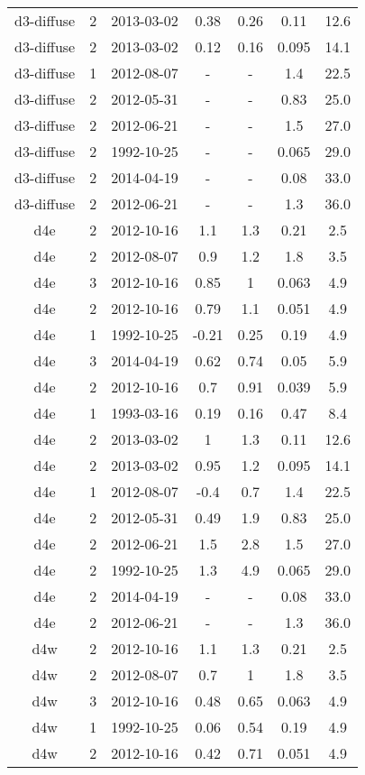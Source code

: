\begin{table*}[htp]
\begin{tabular}{ccccccc}
d3-diffuse & 2 & 2013-03-02 & 0.38 & 0.26 & 0.11 & 12.6 \\
d3-diffuse & 2 & 2013-03-02 & 0.12 & 0.16 & 0.095 & 14.1 \\
d3-diffuse & 1 & 2012-08-07 & - & - & 1.4 & 22.5 \\
d3-diffuse & 2 & 2012-05-31 & - & - & 0.83 & 25.0 \\
d3-diffuse & 2 & 2012-06-21 & - & - & 1.5 & 27.0 \\
d3-diffuse & 2 & 1992-10-25 & - & - & 0.065 & 29.0 \\
d3-diffuse & 2 & 2014-04-19 & - & - & 0.08 & 33.0 \\
d3-diffuse & 2 & 2012-06-21 & - & - & 1.3 & 36.0 \\
d4e & 2 & 2012-10-16 & 1.1 & 1.3 & 0.21 & 2.5 \\
d4e & 2 & 2012-08-07 & 0.9 & 1.2 & 1.8 & 3.5 \\
d4e & 3 & 2012-10-16 & 0.85 & 1 & 0.063 & 4.9 \\
d4e & 2 & 2012-10-16 & 0.79 & 1.1 & 0.051 & 4.9 \\
d4e & 1 & 1992-10-25 & -0.21 & 0.25 & 0.19 & 4.9 \\
d4e & 3 & 2014-04-19 & 0.62 & 0.74 & 0.05 & 5.9 \\
d4e & 2 & 2012-10-16 & 0.7 & 0.91 & 0.039 & 5.9 \\
d4e & 1 & 1993-03-16 & 0.19 & 0.16 & 0.47 & 8.4 \\
d4e & 2 & 2013-03-02 & 1 & 1.3 & 0.11 & 12.6 \\
d4e & 2 & 2013-03-02 & 0.95 & 1.2 & 0.095 & 14.1 \\
d4e & 1 & 2012-08-07 & -0.4 & 0.7 & 1.4 & 22.5 \\
d4e & 2 & 2012-05-31 & 0.49 & 1.9 & 0.83 & 25.0 \\
d4e & 2 & 2012-06-21 & 1.5 & 2.8 & 1.5 & 27.0 \\
d4e & 2 & 1992-10-25 & 1.3 & 4.9 & 0.065 & 29.0 \\
d4e & 2 & 2014-04-19 & - & - & 0.08 & 33.0 \\
d4e & 2 & 2012-06-21 & - & - & 1.3 & 36.0 \\
d4w & 2 & 2012-10-16 & 1.1 & 1.3 & 0.21 & 2.5 \\
d4w & 2 & 2012-08-07 & 0.7 & 1 & 1.8 & 3.5 \\
d4w & 3 & 2012-10-16 & 0.48 & 0.65 & 0.063 & 4.9 \\
d4w & 1 & 1992-10-25 & 0.06 & 0.54 & 0.19 & 4.9 \\
d4w & 2 & 2012-10-16 & 0.42 & 0.71 & 0.051 & 4.9 \\

\end{tabular}
\end{table*}
